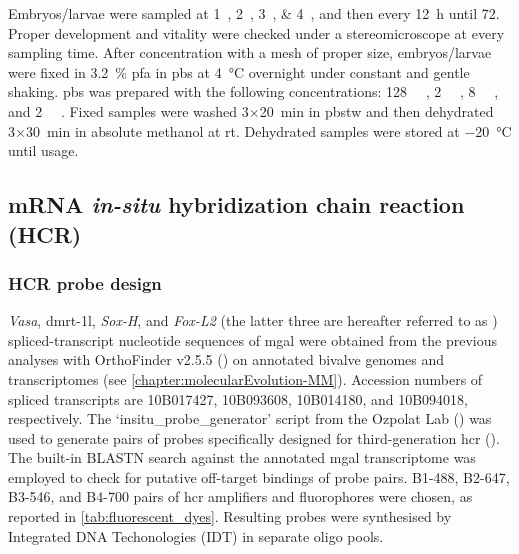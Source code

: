 Embryos/larvae were sampled at \qtylist{1;2;3;4}{\hpf}, and then every \qty{12}{\hour} until \qty{72}{\hpf}. Proper development and vitality were checked under a stereomicroscope at every sampling time. After concentration with a mesh of proper size, embryos/larvae were fixed in \qty{3.2}{\percent} \gls{pfa} in \gls{pbs} at \qty{4}{\degreeCelsius} overnight under constant and gentle shaking. \gls{pbs} was prepared with the following concentrations: \qty{128}{\milli\molar} , \qty{2}{\milli\molar} , \qty{8}{\milli\molar} , and \qty{2}{\milli\molar} . Fixed samples were washed 3×\qty{20}{min} in \gls{pbstw} and then dehydrated 3×\qty{30}{\minute} in absolute methanol at \gls{rt}. Dehydrated samples were stored at \qty{-20}{\degreeCelsius} until usage.

\subsection{mRNA \textit{in-situ} hybridization chain reaction (HCR)}
\subsubsection{HCR probe design}
\textit{Vasa}, \gls{dmrt-1l}, \textit{Sox-H}, and \textit{Fox-L2} (the latter three are hereafter referred to as ) spliced-transcript nucleotide sequences of \gls{mgal} were obtained from the previous analyses with OrthoFinder v2.5.5 () on annotated bivalve genomes and transcriptomes (see \cref{chapter:molecularEvolution-MM}). Accession numbers of spliced transcripts are 10B017427, 10B093608, 10B014180, and 10B094018, respectively. The ‘insitu\_probe\_generator’ script from the Ozpolat Lab () was used to generate pairs of probes specifically designed for third-generation \gls{hcr} (). The built-in BLASTN search against the annotated \gls{mgal} transcriptome was employed to check for putative off-target bindings of probe pairs. B1-488, B2-647, B3-546, and B4-700 pairs of \gls{hcr} amplifiers and fluorophores were chosen, as reported in \cref{tab:fluorescent_dyes}. Resulting probes were synthesised by Integrated DNA Techonologies (IDT\texttrademark) in separate oligo pools.


